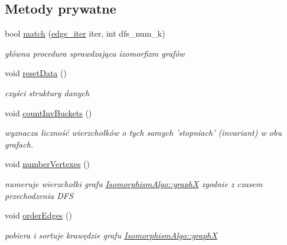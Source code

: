 \subsection*{Metody prywatne}
\begin{DoxyCompactItemize}
\item 
bool \hyperlink{classIsomorphismAlgo_aa10814d9f3fe70fde74ec4f6aadb6273}{match} (\hyperlink{classIsomorphismAlgo_a2c5e2b83f11243efd51460172b3b0cfa}{edge\-\_\-iter} iter, int dfs\-\_\-num\-\_\-k)
\begin{DoxyCompactList}\small\item\em główna procedura sprawdzająca izomorfizm grafów \end{DoxyCompactList}\item 
void \hyperlink{classIsomorphismAlgo_a249ab9bd04912a86f39388976dd055ca}{reset\-Data} ()
\begin{DoxyCompactList}\small\item\em czyści struktury danych \end{DoxyCompactList}\item 
void \hyperlink{classIsomorphismAlgo_af639949389513c66aa9d4c9dd686b147}{count\-Inv\-Buckets} ()
\begin{DoxyCompactList}\small\item\em wyznacza liczność wierzchołków o tych samych 'stopniach' (invariant) w obu grafach. \end{DoxyCompactList}\item 
void \hyperlink{classIsomorphismAlgo_a491943424391031d479fdcde3afb2ed5}{number\-Vertexes} ()
\begin{DoxyCompactList}\small\item\em numeruje wierzchołki grafu \hyperlink{classIsomorphismAlgo_a78bc7264b0a6a264b0343209b3ca3647}{Isomorphism\-Algo\-::graph\-X} zgodnie z czasem przechodzenia D\-F\-S \end{DoxyCompactList}\item 
void \hyperlink{classIsomorphismAlgo_a5b487ae56ceec1206c0c0e21fb49def0}{order\-Edges} ()
\begin{DoxyCompactList}\small\item\em pobiera i sortuje krawędzie grafu \hyperlink{classIsomorphismAlgo_a78bc7264b0a6a264b0343209b3ca3647}{Isomorphism\-Algo\-::graph\-X} \end{DoxyCompactList}\end{DoxyCompactItemize}
